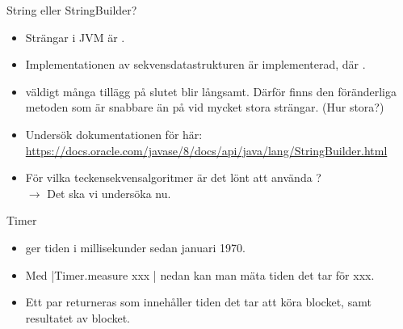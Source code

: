 \begin{Slide}{String eller StringBuilder?}
\begin{itemize}
\item Strängar i JVM är .

\item Implementationen av sekvensdatastrukturen  är  implementerad, där .

\item {} väldigt många tillägg på slutet blir långsamt. Därför finns den föränderliga  metoden  som är snabbare än \code{+} på  vid mycket stora strängar. (Hur stora?)

\pause
\item Undersök dokumentationen för  här:
{\SlideFontTiny\url{https://docs.oracle.com/javase/8/docs/api/java/lang/StringBuilder.html}}

\pause
\item För vilka teckensekvensalgoritmer är det lönt att använda ? \\
\pause $\rightarrow$ Det ska vi undersöka nu.

\end{itemize}
\end{Slide}

\ifkompendium\else
\begin{SlideExtra}{Timer}\SlideFontSmall
\setlength{\leftmargini}{0pt}
\begin{itemize}
\item \href{https://docs.oracle.com/javase/8/docs/api/java/lang/System.html#currentTimeMillis--}{} ger tiden i millisekunder sedan januari 1970.

\item Med \code|Timer.measure{ xxx }| nedan kan man mäta tiden det tar för xxx.

\item Ett par  returneras som innehåller tiden det tar att köra blocket, samt resultatet av blocket.
\end{itemize}
\vspace{0em}
\end{SlideExtra}



